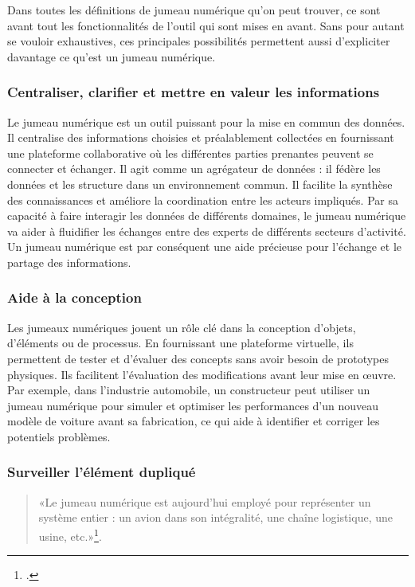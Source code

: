 Dans toutes les définitions de jumeau numérique qu’on peut trouver, ce sont avant tout les fonctionnalités de l’outil qui sont mises en avant. Sans pour autant se vouloir exhaustives, ces principales possibilités permettent aussi d’expliciter davantage ce qu’est un jumeau numérique.

            \subsubsection{Centraliser, clarifier et mettre en valeur les informations}

Le jumeau numérique est un outil puissant pour la mise en commun des données. Il centralise des informations choisies et préalablement collectées en fournissant une plateforme collaborative où les différentes parties prenantes peuvent se connecter et échanger. Il agit comme un agrégateur de données : il fédère les données et les structure dans un environnement commun. Il facilite la synthèse des connaissances et améliore la coordination entre les acteurs impliqués. Par sa capacité à faire interagir les données de différents domaines, le jumeau numérique va aider à fluidifier les échanges entre des experts de différents secteurs d'activité. Un jumeau numérique est par conséquent une aide précieuse pour l’échange et le partage des informations.

            \subsubsection{Aide à la conception}

Les jumeaux numériques jouent un rôle clé dans la conception d'objets, d'éléments ou de processus. En fournissant une plateforme virtuelle, ils permettent de tester et d’évaluer des concepts sans avoir besoin de prototypes physiques. Ils facilitent l'évaluation des modifications avant leur mise en œuvre. Par exemple, dans l'industrie automobile, un constructeur peut utiliser un jumeau numérique pour simuler et optimiser les performances d'un nouveau modèle de voiture avant sa fabrication, ce qui aide à identifier et corriger les potentiels problèmes.

            \subsubsection{Surveiller l’élément dupliqué}

\begin{quote}«Le jumeau numérique est aujourd'hui employé pour représenter un système entier : un avion dans son intégralité, une chaîne logistique, une usine, etc.»\footcite{garcia-monteroJumeauNumeriqueQu2023}.
\end{quote}

